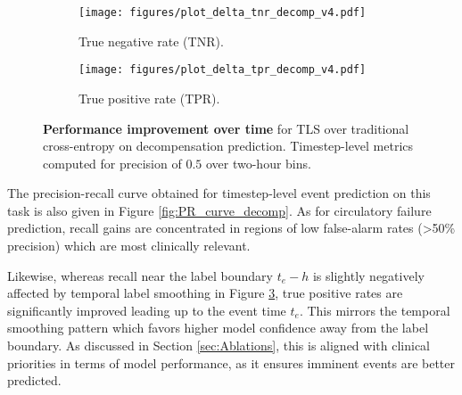 \documentclass[nohyperref]{article}
\begin{document}
\begin{figure}[h]
\begin{subfigure}[b]{0.47\textwidth}
  \centering
  \texttt{[image: figures/plot\_delta\_tnr\_decomp\_v4.pdf]}\vspace{-0.5em}\caption{True negative rate (TNR).}
  \label{fig:delta_tnr_decomp}
\end{subfigure} \hfill
\begin{subfigure}[b]{0.47\textwidth}
 \centering
  \texttt{[image: figures/plot\_delta\_tpr\_decomp\_v4.pdf]}\vspace{-0.5em}\caption{True positive rate (TPR).}
  \label{fig:delta_tpr_decomp}
\end{subfigure}
\caption{\textbf{Performance improvement over time} for TLS over traditional cross-entropy on decompensation prediction. Timestep-level metrics computed for precision of $0.5$ over two-hour bins.}
\vspace{-1em}
\label{fig:plot_delta_decomp}
\end{figure}

The precision-recall curve obtained for timestep-level event prediction on this task is also given in Figure \ref{fig:PR_curve_decomp}. As for circulatory failure prediction, recall gains are concentrated in regions of low false-alarm rates (>50\% precision) which are most clinically relevant. 

Likewise, whereas recall near the label boundary $t_e -h$ is slightly negatively affected by temporal label smoothing in Figure \ref{fig:plot_delta_decomp}, true positive rates are significantly improved leading up to the event time $t_e$. This mirrors the temporal smoothing pattern which favors higher model confidence away from the label boundary. As discussed in Section \ref{sec:Ablations}, this is aligned with clinical priorities in terms of model performance, as it ensures imminent events are better predicted.
\end{document}
